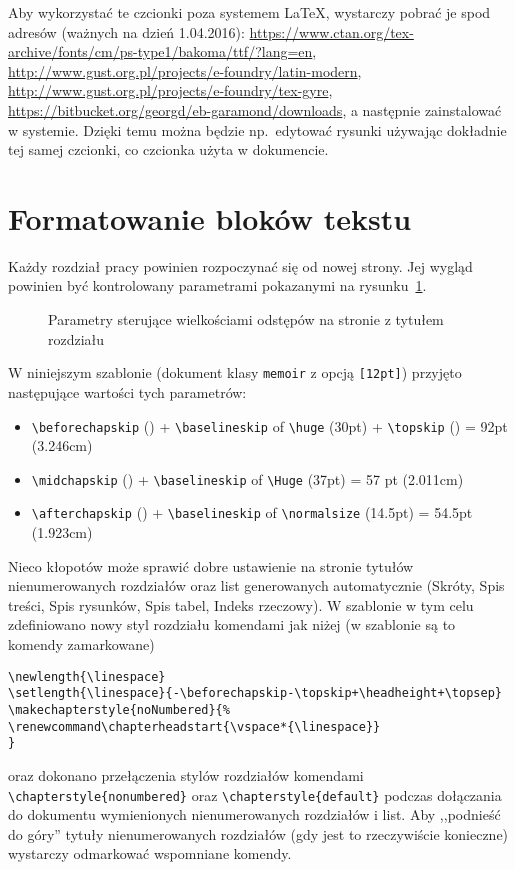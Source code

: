 Aby wykorzystać te czcionki poza systemem LaTeX, wystarczy pobrać je spod adresów (ważnych na dzień
1.04.2016): 
\url{https://www.ctan.org/tex-archive/fonts/cm/ps-type1/bakoma/ttf/?lang=en}, \url{http://www.gust.org.pl/projects/e-foundry/latin-modern}, \url{http://www.gust.org.pl/projects/e-foundry/tex-gyre}, \url{https://bitbucket.org/georgd/eb-garamond/downloads},
a następnie zainstalować w systemie. Dzięki temu można będzie np.~edytować rysunki używając dokładnie tej samej czcionki, co czcionka użyta w dokumencie.

\section{Formatowanie bloków tekstu}
Każdy rozdział pracy powinien rozpoczynać się od nowej strony. Jej wygląd powinien być kontrolowany parametrami pokazanymi na rysunku~\ref{fig:LayChap}.
\begin{figure}[t]
\centering
\chapterdiagram
\caption{Parametry sterujące wielkościami odstępów na stronie z tytułem rozdziału} 
\label{fig:LayChap}
\end{figure}
W niniejszym szablonie (dokument klasy \texttt{memoir} z opcją \texttt{[12pt]}) przyjęto następujące wartości tych parametrów:
\begin{itemize}
\item \verb?\beforechapskip? (\printlength{\beforechapskip}) + \verb?\baselineskip? of \verb+\huge+ (30pt) + \verb+\topskip+ (\printlength{\topskip}) = 92pt (3.246cm)
\item \verb?\midchapskip? (\printlength{\midchapskip}) + \verb?\baselineskip? of \verb+\Huge+ (37pt) = 57 pt (2.011cm)
\item \verb?\afterchapskip? (\printlength{\afterchapskip}) + \verb+\baselineskip+ of \verb+\normalsize+ (14.5pt) = 54.5pt (1.923cm)
\end{itemize}

Nieco kłopotów może sprawić dobre ustawienie na stronie tytułów nienumerowanych rozdziałów oraz list generowanych automatycznie (Skróty, Spis treści, Spis rysunków, Spis tabel, Indeks rzeczowy). W szablonie w tym celu zdefiniowano nowy styl rozdziału komendami jak niżej (w szablonie są to komendy zamarkowane)
\begin{lstlisting}[basicstyle=\footnotesize\ttfamily]
\newlength{\linespace}
\setlength{\linespace}{-\beforechapskip-\topskip+\headheight+\topsep}
\makechapterstyle{noNumbered}{%
\renewcommand\chapterheadstart{\vspace*{\linespace}}
}
\end{lstlisting}
oraz dokonano przełączenia stylów rozdziałów komendami \verb?\chapterstyle{nonumbered}? oraz \verb?\chapterstyle{default}? podczas dołączania do dokumentu wymienionych nienumerowanych rozdziałów i list. Aby ,,podnieść do góry'' tytuły nienumerowanych rozdziałów (gdy jest to rzeczywiście konieczne) wystarczy odmarkować wspomniane komendy.

